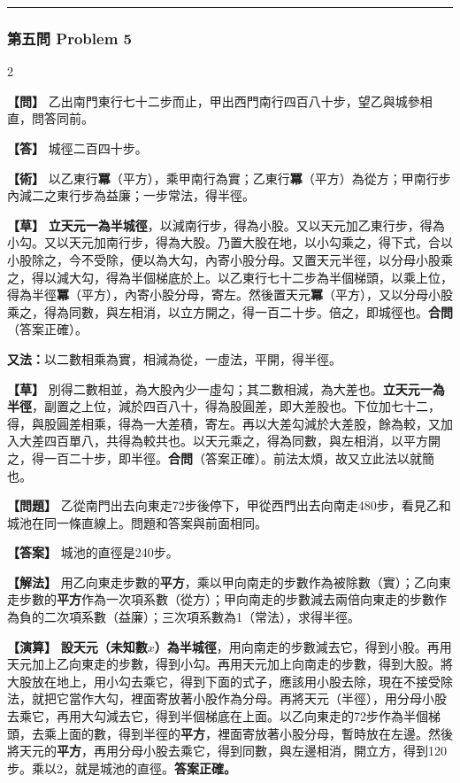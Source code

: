 \documentclass[11pt,a4paper]{article}
\newcommand{\wen}[1]{\par\noindent\textbf{\color{problemcolor}【問】} #1\par}
\newcommand{\da}[1]{\par\noindent\textbf{\color{problemcolor}【答】} #1\par}
\newcommand{\shu}[1]{\par\noindent\textbf{\color{problemcolor}【術】} #1\par}
\newcommand{\cao}[1]{\par\noindent\textbf{\color{problemcolor}【草】} #1\par}
\newcommand{\wenm}[1]{\par\noindent\textbf{\color{problemcolor}【問題】} #1\par}
\newcommand{\dam}[1]{\par\noindent\textbf{\color{problemcolor}【答案】} #1\par}
\newcommand{\shum}[1]{\par\noindent\textbf{\color{problemcolor}【解法】} #1\par}
\newcommand{\caom}[1]{\par\noindent\textbf{\color{problemcolor}【演算】} #1\par}
\begin{document}
\vspace{0.5cm}
\noindent\textcolor{rulecolor}{\rule{\textwidth}{0.4pt}}

\subsubsection*{第五問 \quad Problem 5}

\begin{paracol}{2}
\wen{乙出南門東行七十二步而止，甲出西門南行四百八十步，望乙與城參相直，問答同前。}

\da{城徑二百四十步。}

\shu{以乙東行\textbf{冪}（平方），乘甲南行為實；乙東行\textbf{冪}（平方）為從方；甲南行步內減二之東行步為益廉；一步常法，得半徑。}

\cao{\textbf{立天元一為半城徑}，以減南行步，得為小股。又以天元加乙東行步，得為小勾。又以天元加南行步，得為大股。乃置大股在地，以小勾乘之，得下式，合以小股除之，今不受除，便以為大勾，內寄小股分母。又置天元半徑，以分母小股乘之，得以減大勾，得為半個梯底於上。以乙東行七十二步為半個梯頭，以乘上位，得為半徑\textbf{冪}（平方），內寄小股分母，寄左。然後置天元\textbf{冪}（平方），又以分母小股乘之，得為同數，與左相消，以立方開之，得一百二十步。倍之，即城徑也。\textbf{合問}（答案正確）。}

\vspace{0.2cm}
\noindent\textbf{又法：}以二數相乘為實，相減為從，一虛法，平開，得半徑。

\cao{別得二數相並，為大股內少一虛勾；其二數相減，為大差也。\textbf{立天元一為半徑}，副置之上位，減於四百八十，得為股圓差，即大差股也。下位加七十二，得，與股圓差相乘，得為一大差積，寄左。再以大差勾減於大差股，餘為較，又加入大差四百單八，共得為較共也。以天元乘之，得為同數，與左相消，以平方開之，得一百二十步，即半徑。\textbf{合問}（答案正確）。前法太煩，故又立此法以就簡也。}

\switchcolumn
\wenm{乙從南門出去向東走72步後停下，甲從西門出去向南走480步，看見乙和城池在同一條直線上。問題和答案與前面相同。}

\dam{城池的直徑是240步。}

\shum{用乙向東走步數的\textbf{平方}，乘以甲向南走的步數作為被除數（實）；乙向東走步數的\textbf{平方}作為一次項系數（從方）；甲向南走的步數減去兩倍向東走的步數作為負的二次項系數（益廉）；三次項系數為1（常法），求得半徑。}

\caom{\textbf{設天元（未知數$x$）為半城徑}，用向南走的步數減去它，得到小股。再用天元加上乙向東走的步數，得到小勾。再用天元加上向南走的步數，得到大股。將大股放在地上，用小勾去乘它，得到下面的式子，應該用小股去除，現在不接受除法，就把它當作大勾，裡面寄放著小股作為分母。再將天元（半徑），用分母小股去乘它，再用大勾減去它，得到半個梯底在上面。以乙向東走的72步作為半個梯頭，去乘上面的數，得到半徑的\textbf{平方}，裡面寄放著小股分母，暫時放在左邊。然後將天元的\textbf{平方}，再用分母小股去乘它，得到同數，與左邊相消，開立方，得到120步。乘以2，就是城池的直徑。\textbf{答案正確。}}


\end{paracol}
\end{document}
